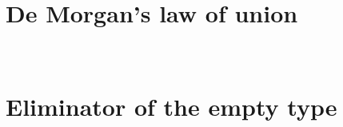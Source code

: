 \begin{appendices}
\section{De Morgan's law of union}
\begin{code}
    \>[2]\AgdaSpace{}%
    \AgdaSymbol{:}\AgdaSpace{}%
    \AgdaSpace{}%
    \AgdaSymbol{(}\AgdaSpace{}%
    \AgdaSpace{}%
    \AgdaSymbol{)}\AgdaSpace{}%
    \AgdaSpace{}%
    \AgdaSymbol{(}\AgdaSpace{}%
    \AgdaSymbol{)}\AgdaSpace{}%
    \AgdaSpace{}%
    \AgdaSymbol{(}\AgdaSpace{}%
    \AgdaSymbol{)}\<%
    \\
    \>[2]\AgdaSpace{}%
    \AgdaSpace{}%
    \AgdaSymbol{=}\AgdaSpace{}%
    \AgdaSymbol{((}\AgdaSpace{}%
    \AgdaSpace{}%
    \AgdaSymbol{)}\AgdaSpace{}%
    \AgdaOperator{\AgdaInductiveConstructor{,}}\AgdaSpace{}%
    \AgdaSymbol{(}\AgdaSpace{}%
    \AgdaSpace{}%
    \AgdaSymbol{))}\<%
\end{code}

\section{Eliminator of the empty type}
\label{code:bottom-eliminator}
\begin{code}
    \>[0]\AgdaSpace{}%
    \AgdaSymbol{:}\AgdaSpace{}%
    \AgdaSymbol{\{}\AgdaSpace{}%
    \AgdaSymbol{:}\AgdaSpace{}%
    \AgdaSymbol{\}}\AgdaSpace{}%
    \AgdaSpace{}%
    \AgdaSpace{}%
    \AgdaSpace{}%
    \<%
    \\
    \>[0]\AgdaSpace{}%
    \AgdaSymbol{()}\<%
\end{code}


\end{appendices}
